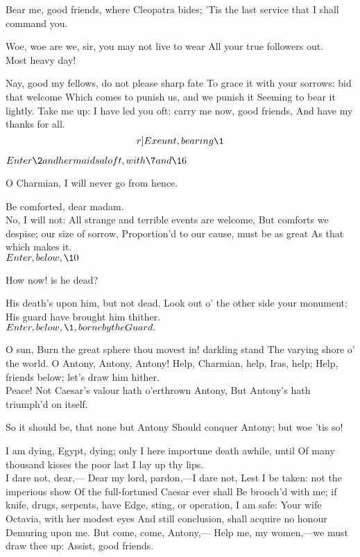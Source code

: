\documentclass{book}
\begin{document}
\1	Bear me, good friends, where Cleopatra bides;
	'Tis the last service that I shall command you.

	Woe, woe are we, sir, you may not live to wear
	All your true followers out. \\

	Most heavy day!

\1	Nay, good my fellows, do not please sharp fate
	To grace it with your sorrows: bid that welcome
	Which comes to punish us, and we punish it
	Seeming to bear it lightly. Take me up:
	I have led you oft: carry me now, good friends,
	And have my thanks for all. \[r]Exeunt, bearing \1\]




	\(Enter \2 and her maids aloft,\\ with \7 and \16\)

\2	O Charmian, I will never go from hence.

\7	Be comforted, dear madam. \\

\2	No, I will not:
	All strange and terrible events are welcome,
	But comforts we despise; our size of sorrow,
	Proportion'd to our cause, must be as great
	As that which makes it. \\

	\(Enter, below, \10\)

		  How now! is he dead?

	His death's upon him, but not dead.
	Look out o' the other side your monument;
	His guard have brought him thither. \\

	\(Enter, below, \1, borne by the Guard.\)

\2	O sun,
	Burn the great sphere thou movest in! darkling stand
	The varying shore o' the world. O Antony,
	Antony, Antony! Help, Charmian, help, Iras, help;
	Help, friends below; let's draw him hither. \\

\1	Peace!
	Not Caesar's valour hath o'erthrown Antony,
	But Antony's hath triumph'd on itself.

\2	So it should be, that none but Antony
	Should conquer Antony; but woe 'tis so!

\1	I am dying, Egypt, dying; only
	I here importune death awhile, until
	Of many thousand kisses the poor last
	I lay up thy lips. \\

\2	                  I dare not, dear,---
	Dear my lord, pardon,---I dare not,
	Lest I be taken: not the imperious show
	Of the full-fortuned Caesar ever shall
	Be brooch'd with me; if knife, drugs, serpents, have
	Edge, sting, or operation, I am safe:
	Your wife Octavia, with her modest eyes
	And still conclusion, shall acquire no honour
	Demuring upon me. But come, come, Antony,---
	Help me, my women,---we must draw thee up:
	Assist, good friends. \\
\end{document}
